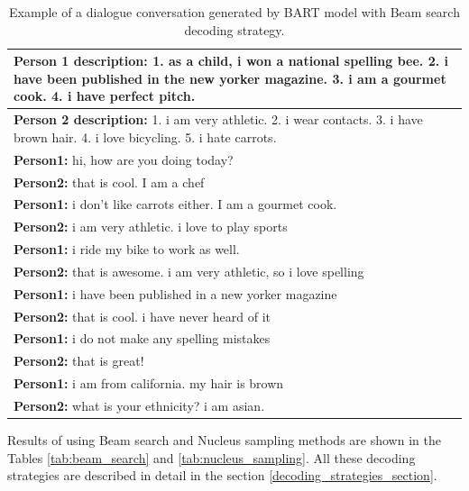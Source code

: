 \begin{table}[H]
\centering
 \begin{tabular}{|p{14cm}|}
 \hline
 \textbf{Person 1 description:} 1. as a child, i won a national spelling bee. 2. i have been published in the new yorker magazine. 3. i am a gourmet cook. 4. i have perfect pitch. \\
 \hline
 \textbf{Person 2 description:} 1. i am very athletic. 2. i wear contacts. 3. i have brown hair. 4. i love bicycling. 5. i hate carrots. \\
 \hline
 \textbf{Person1:} hi, how are you doing today?  \\
 \textbf{Person2:} that is cool. I am a chef  \\ 
 \textbf{Person1:} i don't like carrots either. I am a gourmet cook. \\
 \textbf{Person2:} i am very athletic. i love to play sports \\
 \textbf{Person1:} i ride my bike to work as well. \\
 \textbf{Person2:} that is awesome. i am very athletic, so i love spelling \\
 \textbf{Person1:} i have been published in a new yorker magazine \\
 \textbf{Person2:} that is cool. i have never heard of it \\
 \textbf{Person1:} i do not make any spelling mistakes\\
 \textbf{Person2:} that is great! \\
 \textbf{Person1:} i am from california. my hair is brown \\
 \textbf{Person2:} what is your ethnicity? i am asian. \\
 \hline
 \end{tabular}
 \caption{Example of a dialogue conversation generated by BART model with Beam search decoding strategy.}
\label{tab:bart_experiment}
\end{table}

Results of using Beam search and Nucleus sampling methods are shown in the Tables \ref{tab:beam_search} and \ref{tab:nucleus_sampling}. All these decoding strategies are described in detail in the section \ref{decoding_strategies_section}.

